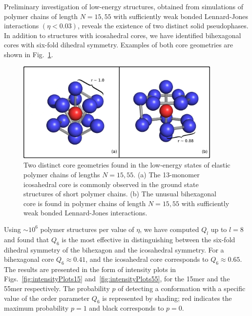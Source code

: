 \documentclass[12pt]{report}
\begin{document}
%
Preliminary investigation of low-energy structures, obtained from simulations of polymer chains of length $N =15,55$ with sufficiently weak bonded Lennard-Jones interactions $(\eta < 0.03)$, reveals the existence of two distinct solid pseudophases. In addition to structures with icosahedral cores, we have identified bihexagonal cores with six-fold dihedral symmetry. Examples of both core geometries are shown in Fig.~\ref{fig:coreStructures}.
%
\begin{figure}
\center
	\includegraphics[width=0.9\textwidth]{chapter6Figs/configurationsMod.eps}			\caption{\label{fig:coreStructures} Two distinct core geometries found in the low-energy states of elastic polymer chains of lengths $N = 15,55$. (a) The 13-monomer icosahedral core is commonly observed in the ground state structures of short polymer chains. (b) The unusual bihexagonal core is found in polymer chains of length $N =15,55$ with sufficiently weak bonded Lennard-Jones interactions.}
\end{figure}
%
Using $\sim 10^{6}$ polymer structures per value of $\eta$, we have computed $Q_{l}$ up to $l = 8$ and found that $Q_{6}$ is the most effective in distinguishing between the six-fold dihedral symmetry of the bihexagon and the icosahedral symmetry. For a bihexagonal core $Q_{6} \approx 0.41$, and the icosahedral core corresponds to $Q_{6} \approx 0.65$. The results are presented in the form of intensity plots in Figs.~\ref{fig:intensityPlots15} and~\ref{fig:intensityPlots55}, for the 15mer and the 55mer respectively. The probability $p$ of detecting a conformation with a specific value of the order parameter $Q_{6}$ is represented by shading; red indicates the maximum probability $p=1$ and black corresponds to $p=0$.
%
%
\end{document}
